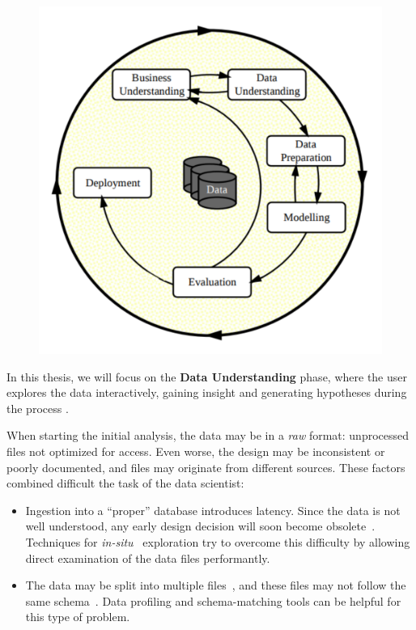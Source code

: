 \begin{figure}[htb]
    \centering
    \includegraphics[width=0.8\linewidth]{images/1_introduction/crisp-dm.pdf}
    \caption{}
    \label{fig:crispdm}
\end{figure}

In this thesis, we will focus on the \textbf{Data Understanding} phase, where the user
explores the data interactively, gaining insight and generating hypotheses during the process \cite{Geer2014}.

When starting the initial analysis, the data may be in a \emph{raw} format: unprocessed files not
optimized for access. Even worse, the design may be inconsistent or poorly documented, and files may
originate from different sources. These factors combined difficult the task of the data scientist:

\begin{itemize}
    \item Ingestion into a ``proper'' database introduces latency. Since the data is not well
        understood, any early design decision will soon become obsolete~\cite{Kersten2011}.
        Techniques for \emph{in-situ}~\cite{Idreos2011} exploration try to overcome this difficulty
        by allowing direct examination of the data files performantly.
    \item The data may be split into multiple files~\cite{Baud2012}, and these files may not
        follow the same schema~\cite{Alawini2014}. Data profiling and schema-matching tools
        can be helpful for this type of problem.
\end{itemize}

